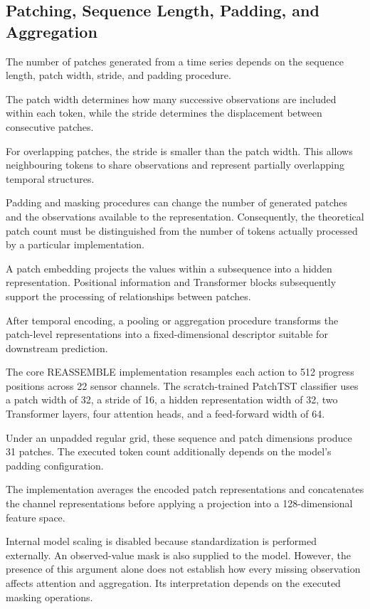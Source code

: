 \subsection{Patching, Sequence Length, Padding, and Aggregation}

The number of patches generated from a time series depends on the sequence length, patch width, stride, and padding procedure.

The patch width determines how many successive observations are included within each token, while the stride determines the displacement between consecutive patches.

For overlapping patches, the stride is smaller than the patch width. This allows neighbouring tokens to share observations and represent partially overlapping temporal structures.

Padding and masking procedures can change the number of generated patches and the observations available to the representation. Consequently, the theoretical patch count must be distinguished from the number of tokens actually processed by a particular implementation.

A patch embedding projects the values within a subsequence into a hidden representation. Positional information and Transformer blocks subsequently support the processing of relationships between patches.

After temporal encoding, a pooling or aggregation procedure transforms the patch-level representations into a fixed-dimensional descriptor suitable for downstream prediction.

The core REASSEMBLE implementation resamples each action to 512 progress positions across 22 sensor channels. The scratch-trained PatchTST classifier uses a patch width of 32, a stride of 16, a hidden representation width of 32, two Transformer layers, four attention heads, and a feed-forward width of 64.

Under an unpadded regular grid, these sequence and patch dimensions produce 31 patches. The executed token count additionally depends on the model’s padding configuration.

The implementation averages the encoded patch representations and concatenates the channel representations before applying a projection into a 128-dimensional feature space.

Internal model scaling is disabled because standardization is performed externally. An observed-value mask is also supplied to the model. However, the presence of this argument alone does not establish how every missing observation affects attention and aggregation. Its interpretation depends on the executed masking operations.

